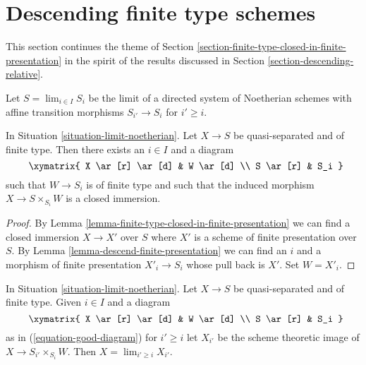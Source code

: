 \section{Descending finite type schemes}
\label{section-finite-type-quasi-separated}

\noindent
This section continues the theme of
Section \ref{section-finite-type-closed-in-finite-presentation}
in the spirit of the results discussed in
Section \ref{section-descending-relative}.

\begin{situation}
\label{situation-limit-noetherian}
Let $S = \lim_{i \in I} S_i$ be the limit of a directed system of
Noetherian schemes with affine transition morphisms $S_{i'} \to S_i$
for $i' \geq i$.
\end{situation}

\begin{lemma}
\label{lemma-good-diagram}
In Situation \ref{situation-limit-noetherian}.
Let $X \to S$ be quasi-separated and of finite type.
Then there exists an $i \in I$ and a diagram
\begin{equation}
\label{equation-good-diagram}
\vcenter{
\xymatrix{
X \ar[r] \ar[d] & W \ar[d] \\
S \ar[r] & S_i
}
}
\end{equation}
such that $W \to S_i$ is of finite type and such that
the induced morphism $X \to S \times_{S_i} W$ is a closed
immersion.
\end{lemma}

\begin{proof}
By Lemma \ref{lemma-finite-type-closed-in-finite-presentation}
we can find a closed immersion $X \to X'$
over $S$ where $X'$ is a scheme of finite presentation over $S$.
By Lemma \ref{lemma-descend-finite-presentation}
we can find an $i$ and a morphism of finite presentation
$X'_i \to S_i$ whose pull back is $X'$. Set $W = X'_i$.
\end{proof}

\begin{lemma}
\label{lemma-limit-from-good-diagram}
In Situation \ref{situation-limit-noetherian}.
Let $X \to S$ be quasi-separated and of finite type.
Given $i \in I$ and a diagram
$$
\vcenter{
\xymatrix{
X \ar[r] \ar[d] & W \ar[d] \\
S \ar[r] & S_i
}
}
$$
as in (\ref{equation-good-diagram}) for $i' \geq i$ let
$X_{i'}$ be the scheme theoretic image of $X \to S_{i'} \times_{S_i} W$.
Then $X = \lim_{i' \geq i} X_{i'}$.
\end{lemma}


